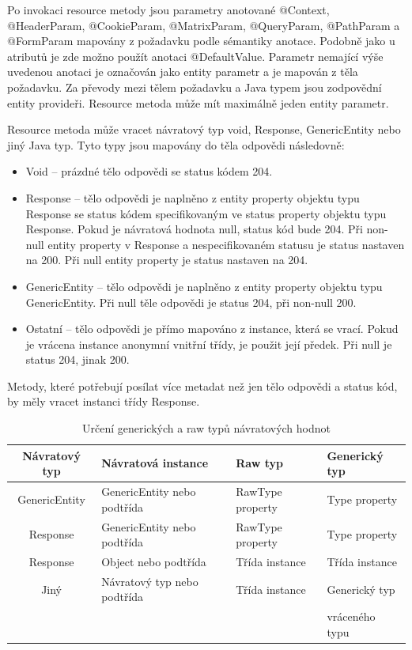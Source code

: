 \documentclass[11pt,twoside,a4paper]{book}
\begin{document}
Po invokaci resource metody jsou parametry anotované @Context, @HeaderParam,
@CookieParam, @MatrixParam, @QueryParam, @PathParam a @FormParam mapovány z
požadavku podle sémantiky anotace. Podobně jako u atributů je zde možno použít anotaci
@DefaultValue. Parametr nemající výše uvedenou anotaci je označován jako entity parametr
a je mapován z těla požadavku. Za převody mezi tělem požadavku a Java typem jsou
zodpovědní entity provideři. Resource metoda může mít maximálně jeden entity parametr.

Resource metoda může vracet návratový typ void, Response, GenericEntity nebo jiný Java
typ. Tyto typy jsou mapovány do těla odpovědi následovně:

\begin{itemize}
  \item Void – prázdné tělo odpovědi se status kódem 204.
  \item Response – tělo odpovědi je naplněno z entity property objektu typu Response se
status kódem specifikovaným ve status property objektu typu Response. Pokud je
návratová hodnota null, status kód bude 204. Při non-null entity property v Response a
nespecifikovaném statusu je status nastaven na 200. Při null entity property je status
nastaven na 204.
  \item GenericEntity – tělo odpovědi je naplněno z entity property objektu typu
GenericEntity. Při null těle odpovědi je status 204, při non-null 200.
  \item Ostatní – tělo odpovědi je přímo mapováno z instance, která se vrací.
Pokud je vrácena instance anonymní vnitřní třídy, je použit její předek. Při null je status 204,
jinak 200.
\end{itemize}

Metody, které potřebují posílat více metadat než jen tělo odpovědi a status kód, by měly
vracet instanci třídy Response.

\begin{table}
\begin{center}
\begin{tabular}{|c|l|l|l|}
\hline
\textbf{Návratový typ} & \textbf{Návratová instance} & \textbf{Raw typ} &
\textbf{Generický typ} \\
\hline
GenericEntity & GenericEntity nebo podtřída & RawType property & Type property \\
\hline
Response & GenericEntity nebo podtřída & RawType property & Type property \\
\hline
Response & Object nebo podtřída  & Třída instance & Třída instance \\
\hline
Jiný & Návratový typ nebo podtřída  & Třída instance & Generický typ \\
&&&  vráceného typu \\
\hline
\end{tabular}
\end{center}
\caption{Určení generických a raw typů návratových hodnot}
\label{tab:tab1}
\end{table}
\end{document}
